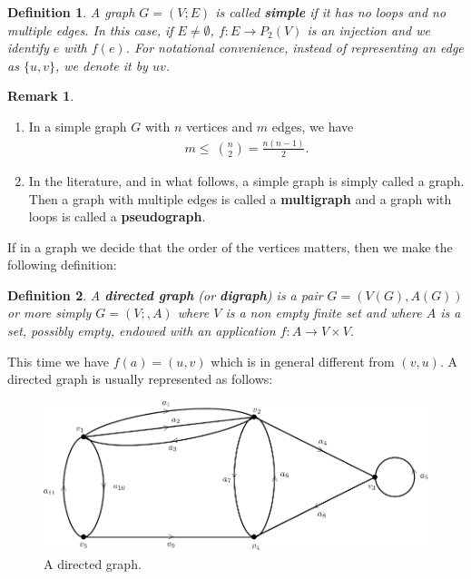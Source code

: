 \documentclass[12pt,a4paper]{article}
\newtheorem{defn}{Definition}[section]
\theoremstyle{definition}
\newtheorem{rem}{Remark}[section]
\begin{document}
\begin{defn} A graph $G=(V;E)$ is called \textbf{simple} if it has no loops and no multiple edges. In this case, if $E \neq \emptyset$, $f: E \to P_2(V)$ is an injection and we identify $e$ with $f(e)$. For notational convenience, instead of representing an edge as $\{u,v\}$, we denote it by $uv$. 
\end{defn}
\begin{rem} \
\begin{enumerate}
\item  In a simple graph $G$ with $n$ vertices and $m$ edges, we have 
\begin{align*}
m \leq \ { n \choose 2} = \frac{n(n-1)}{2}.
\end{align*}
\item In the literature, and in what follows, a simple graph is simply called a graph. Then a graph with multiple edges is called a \textbf{multigraph} and a graph with loops is called a \textbf{pseudograph}.
\end{enumerate}
\end{rem}
If in a graph we decide that the order of the vertices matters, then we make the following definition:
\begin{defn} A \textbf{directed graph} (or \textbf{digraph}) is a pair $G=(V(G),A(G))$ or more simply $G=(V;,A)$ where $V$ is a non empty finite set and where $A$ is a set, possibly empty, endowed with an application $f: A \to V \times V$.
\end{defn}
This time we have $f(a)=(u,v)$ which is in general different from $(v,u)$. A directed graph is usually represented as follows: 
\newpage
\begin{figure}[hbtp]
\centering
\includegraphics[scale=.8]{images/graph3.pdf}
\caption{A directed graph.}
\end{figure}
\end{document}

